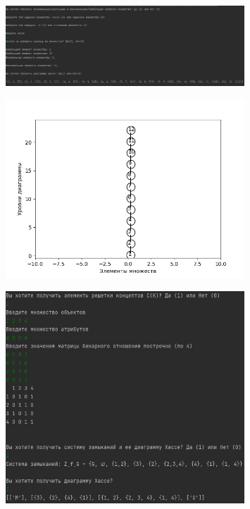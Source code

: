\documentclass[bachelor, och, labwork]{shiza}
\begin{document}
        \begin{figure}[H]
            \centering
            \includegraphics[width=0.8\textwidth]{pic/6.png}
            \caption{}
        \end{figure}

        \begin{figure}[H]
            \centering
            \includegraphics[width=0.8\textwidth]{pic/7.png}
            \caption{}
        \end{figure}

        \begin{figure}[H]
            \centering
            \includegraphics[width=0.8\textwidth]{pic/8.png}
            \caption{}
        \end{figure}
    
\end{document}
